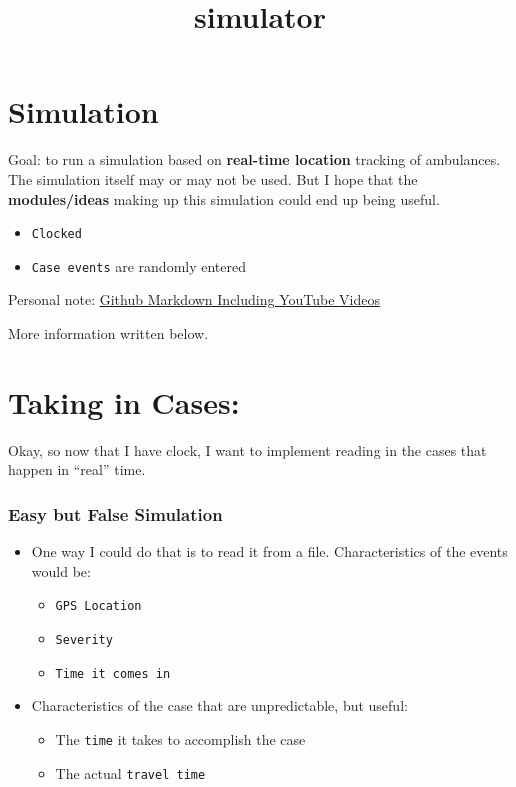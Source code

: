 \documentclass[11pt]{article}
\title{simulator}
\providecommand{\tightlist}{%
      \setlength{\itemsep}{0pt}\setlength{\parskip}{0pt}}
\begin{document}
    
    
    \maketitle
    
    

    
    \hypertarget{simulation}{%
\section{Simulation}\label{simulation}}

Goal: to run a simulation based on \textbf{real-time location} tracking
of ambulances. The simulation itself may or may not be used. But I hope
that the \textbf{modules/ideas} making up this simulation could end up
being useful.

\begin{itemize}
\tightlist
\item
  \texttt{Clocked}
\item
  \texttt{Case\ events} are randomly entered
\end{itemize}

Personal note:
\href{https://github.com/adam-p/markdown-here/wiki/Markdown-Cheatsheet}{Github
Markdown Including YouTube Videos}

More information written below.

    \hypertarget{taking-in-cases}{%
\section{Taking in Cases:}\label{taking-in-cases}}

Okay, so now that I have clock, I want to implement reading in the cases
that happen in ``real'' time.

\hypertarget{easy-but-false-simulation}{%
\subsubsection{Easy but False
Simulation}\label{easy-but-false-simulation}}

\begin{itemize}
\item
  One way I could do that is to read it from a file. Characteristics of
  the events would be:

  \begin{itemize}
  \tightlist
  \item
    \texttt{GPS\ Location}
  \item
    \texttt{Severity}
  \item
    \texttt{Time\ it\ comes\ in}
  \end{itemize}
\item
  Characteristics of the case that are unpredictable, but useful:

  \begin{itemize}
  \tightlist
  \item
    The \texttt{time} it takes to accomplish the case
  \item
    The actual \texttt{travel\ time}
  \end{itemize}
\end{itemize}
\end{document}
